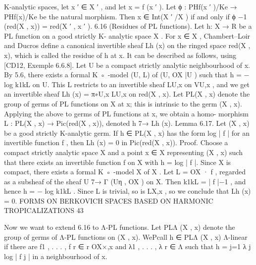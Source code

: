 \documentclass[
  10pt,
]{article}
\newenvironment{Shaded}{}{}
\newcommand{\NormalTok}[1]{#1}
\begin{document}
\begin{Shaded}
\begin{Highlighting}[]
\NormalTok{K{-}analytic spaces, let x ′ ∈ X ′ , and let x = f (x ′ ). Let ϕ : PHf(x ′ )/Ke → PHf(x)/Ke be the natural}
\NormalTok{morphism. Then x ∈ Int(X ′ /X ) if and only if ϕ −1 (red(X , x)) = red(X ′ , x ′ ).}
\NormalTok{6.16 (Residues of PL functions). Let h: X → R be a PL function on a good strictly K{-}}
\NormalTok{analytic space X . For x ∈ X , Chambert–Loir and Ducros define a canonical invertible}
\NormalTok{sheaf Lh (x) on the ringed space red(X , x), which is called the residue of h at x. It can be}
\NormalTok{described as follows, using [CD12, Exemple 6.6.8]. Let U be a compact strictly analytic}
\NormalTok{neighbourhood of x. By 5.6, there exists a formal K ◦ {-}model (U, L) of (U, OX |U ) such that}
\NormalTok{h = − log k1kL on U. This L restricts to an invertible sheaf LU,x on VU,x , and we get an}
\NormalTok{invertible sheaf Lh (x) = π∗U,x LU,x on red(X , x).}
\NormalTok{  Let PL(X , x) denote the group of germs of PL functions on X at x; this is intrinsic to}
\NormalTok{the germ (X , x). Applying the above to germs of PL functions at x, we obtain a homo{-}}
\NormalTok{morphism L : PL(X , x) → Pic(red(X , x)), denoted h 7→ Lh (x).}
\NormalTok{Lemma 6.17. Let (X , x) be a good strictly K{-}analytic germ. If h ∈ PL(X , x) has the form}
\NormalTok{log | f | for an invertible function f , then Lh (x) = 0 in Pic(red(X , x)).}
\NormalTok{Proof. Choose a compact strictly analytic space X and a point x ∈ X representing (X , x)}
\NormalTok{such that there exists an invertible function f on X with h = log | f |. Since X is compact,}
\NormalTok{there exists a formal K ◦ {-}model X of X . Let L = OX · f , regarded as a subsheaf of the sheaf}
\NormalTok{U 7→ Γ (Uη , OX ) on X. Then k1kL = | f |−1 , and hence h = − log k1kL . Since L is trivial, so}
\NormalTok{is LX,x , so we conclude that Lh (x) = 0.                                                    }
\NormalTok{               FORMS ON BERKOVICH SPACES BASED ON HARMONIC TROPICALIZATIONS                      43}

\NormalTok{   Now we want to extend 6.16 to Λ{-}PL functions. Let PLΛ (X , x) denote the group of}
\NormalTok{germs of Λ{-}PL functions on (X , x). WePcall h ∈ PLΛ (X , x) Λ{-}linear if there are f1 , . . . , f r ∈}
\NormalTok{                                             r}
\NormalTok{OX×,x and λ1 , . . . , λ r ∈ Λ such that h = j=1 λ j log | f j | in a neighbourhood of x.}


\end{Highlighting}
\end{Shaded}
\end{document}
